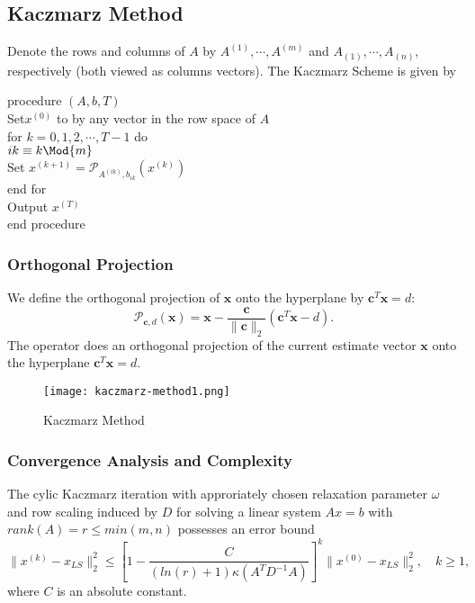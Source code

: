 
\subsection{Kaczmarz Method}


Denote the rows and columns of $A$ by $A^{(1)}, \cdots, A^{(m)}$ and $A_{(1)},\cdots,A_{(n)},$ respectively (both viewed as columns vectors). The Kaczmarz Scheme is given by
\begin{tcolorbox}
procedure $(A,b,T)$ \\
\quad Set\quad $ x^{(0)} $ \quad to by any vector in the row space of $A$\\
\quad for $k = 0,1,2,\cdots, T-1$ do \\
\quad \quad $ik \equiv k \Mod{m}$ \\
\quad \quad Set $x^{(k+1)} = \mathcal{P}_{A^{(ik)},b_{ik}}(x^{(k)}) $\\
\quad end for \\
\quad Output $x^{(T)}$  \\
end procedure
\end{tcolorbox}


\subsubsection{Orthogonal Projection}
We define the orthogonal projection of $\mathbf{x}$ onto the hyperplane by \quad $\mathbf{c}^T \mathbf{x} = d$:
$$
\mathcal{P}_{\mathbf{c},d}(\mathbf{x}) = \mathbf{x} - \frac{\mathbf{c}}{\| \mathbf{c} \|_2} (\mathbf{c} ^T \mathbf{x} - d).
$$
The operator does an orthogonal projection of the current estimate vector $\mathbf{x}$ onto the hyperplane $\mathbf{c}^T \mathbf{x} =d$.
\begin{figure}[htbp]
    \texttt{[image: kaczmarz-method1.png]}
    \caption{Kaczmarz Method}
    \label{fig:kaczmarz method}
\end{figure}

\subsubsection{Convergence Analysis and Complexity}
\begin{theorem}
The cylic Kaczmarz iteration with approriately chosen relaxation parameter $\omega$ and row scaling induced by $D$ for solving a linear system $Ax = b$ with $rank(A) = r \leq min(m,n)$ possesses an error bound
$$
\| x^{(k)} - x_{LS} \|_2^2 \leq \left[ 1 - \frac{C}{(ln(r)+1) \kappa(A^T D^{-1} A)}\right] ^k \| x^{(0)} - x_{LS} \|_2^2, \quad k \geq 1,
$$
where $C$ is an absolute constant.
\end{theorem}

